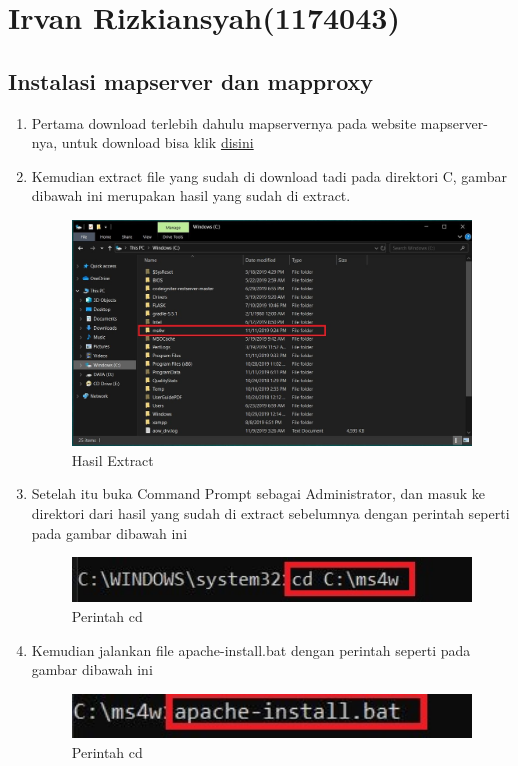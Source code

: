 \section{Irvan Rizkiansyah(1174043)}
	\subsection{Instalasi mapserver dan mapproxy}
		\begin{enumerate}
			\item Pertama download terlebih dahulu mapservernya pada website mapserver-nya, untuk download bisa klik \href{https://mapserver.org/} {disini}
			
			\item Kemudian extract file yang sudah di download tadi pada direktori C, gambar dibawah ini merupakan hasil yang sudah di extract.
				\begin{figure}[H]
					\includegraphics[width=12cm]{figures/1174043/TUGAS4/1.JPG}
					\centering
					\caption{Hasil Extract}
				\end{figure}
			
			\item Setelah itu buka Command Prompt sebagai Administrator, dan masuk ke direktori dari hasil yang sudah di extract sebelumnya dengan perintah seperti pada gambar dibawah ini
				\begin{figure}[H]
					\includegraphics[width=12cm]{figures/1174043/TUGAS4/2.JPG}
					\centering
					\caption{Perintah cd}
				\end{figure}
				
			\item Kemudian jalankan file apache-install.bat dengan perintah seperti pada gambar dibawah ini
				\begin{figure}[H]
					\includegraphics[width=12cm]{figures/1174043/TUGAS4/3.JPG}
					\centering
					\caption{Perintah cd}
				\end{figure}
				

\end{enumerate}
